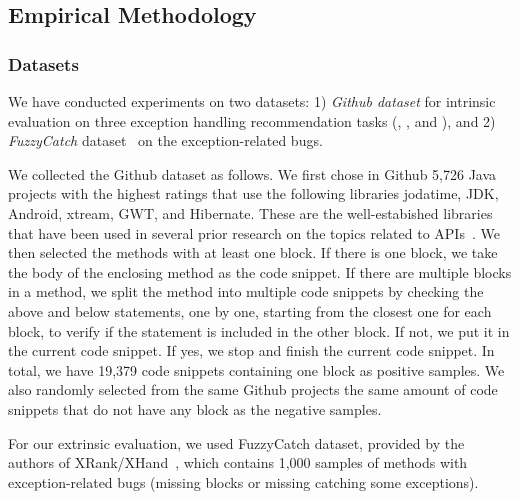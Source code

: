 \subsection{Empirical Methodology}

\subsubsection{Datasets}


We have conducted experiments on two datasets: 1) {\em Github dataset}
for intrinsic evaluation on three exception handling recommendation
tasks ({\xblock}, {\xstate}, and {\xtype}), and 2) {\em FuzzyCatch}
dataset~\cite{xrank-fse20} on the exception-related bugs.


We collected the Github dataset as follows. We first chose in Github
5,726 Java projects with the highest ratings that use
the following libraries jodatime, JDK, Android, xtream, GWT, and
Hibernate. These are the well-estabished libraries that have been used
in several prior research on the topics related to
APIs~\cite{icse18,liveapi14}. We then selected the methods with at
least one  block. If there is one 
block, we take the body of the enclosing method as the code
snippet. If there are multiple  blocks in a method, we
split the method into multiple code snippets by checking the above and
below statements, one by one, starting from the closest one for each
 block, to verify if the statement is included in the
other block. If not, we put it in the current code snippet. If yes, we
stop and finish the current code snippet. In total, we have
19,379 code snippets containing one
 block as positive samples. We also randomly selected
from the same Github projects the same amount of code snippets that do
not have any  block as the negative samples.

For our extrinsic evaluation, we used FuzzyCatch dataset, provided by
the authors of XRank/XHand~\cite{xrank-fse20}, which contains 1,000
samples of methods with exception-related bugs (missing
 blocks or missing catching some exceptions).


